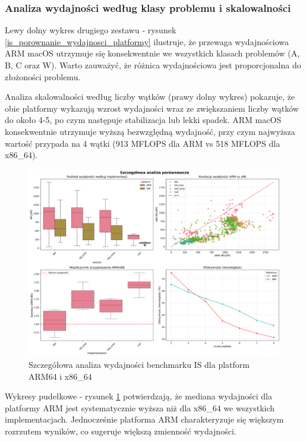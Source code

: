 \subsubsection{Analiza wydajności według klasy problemu i skalowalności}
Lewy dolny wykres drugiego zestawu - rysunek \ref{is_porownanie_wydajnosci_platformy} ilustruje, że przewaga wydajnościowa ARM macOS utrzymuje się konsekwentnie we wszystkich klasach problemów (A, B, C oraz W). Warto zauważyć, że różnica wydajnościowa jest proporcjonalna do złożoności problemu.

Analiza skalowalności według liczby wątków (prawy dolny wykres) pokazuje, że obie platformy wykazują wzrost wydajności wraz ze zwiększaniem liczby wątków do około 4-5, po czym następuje stabilizacja lub lekki spadek. ARM macOS konsekwentnie utrzymuje wyższą bezwzględną wydajność, przy czym najwyższa wartość przypada na 4 wątki (913 MFLOPS dla ARM vs 518 MFLOPS dla x86\_64).

\begin{figure}[H]
    \centering
    \includegraphics[width=\textwidth]{analiza/images/parallel/is/compare/is_szczegolowa_analiza_wydajnosci.png}
    \caption{Szczegółowa analiza wydajności benchmarku IS dla platform ARM64 i x86\_64}
    \label{is_szczegolowa_analiza_wydajnosci}
\end{figure}
Wykresy pudełkowe - rysunek \ref{is_szczegolowa_analiza_wydajnosci} potwierdzają, że mediana wydajności dla platformy ARM jest systematycznie wyższa niż dla x86\_64 we wszystkich implementacjach. Jednocześnie platforma ARM charakteryzuje się większym rozrzutem wyników, co sugeruje większą zmienność wydajności.

